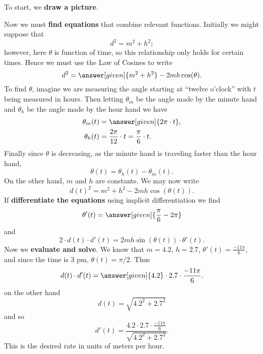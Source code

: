 \documentclass{ximera}
\begin{document}
\begin{example}
  \begin{explanation}
    To start, we \textbf{draw a picture}.
    \begin{image}
    \end{image}
    Now we must \textbf{find equations} that combine relevant
    functions. Initially we might suppose that
    \[
    d^2 = m^2 + h^2;
    \]
    however, here $\theta$ is function of time, so this relationship
    only holds for certain times. Hence we must use the Law of Cosines
    to write
    \[
    d^2 = \answer[given]{m^2 + h^2} - 2mh\cos(\theta).
    \]
    To find $\theta$, imagine we are measuring the angle starting at
    ``twelve o'clock'' with $t$ being measured in hours. Then letting
    $\theta_m$ be the angle made by the minute hand and $\theta_h$ be
    the angle made by the hour hand we have
    \begin{align*}
      \theta_m(t) &= \answer[given]{2\pi \cdot t},\\
      \theta_h(t) &= \frac{2\pi}{12}\cdot t =\frac{\pi}{6}\cdot t.
    \end{align*}
    Finally since $\theta$ is decreasing, as the minute hand is
    traveling faster than the hour hand,
    \[
    \theta(t) = \theta_h(t) - \theta_m(t).
    \]
    On the other hand, $m$ and $h$ are constants. We may now write
    \[
    d(t)^2 = m^2 + h^2 - 2mh\cos(\theta(t)).
    \]
    If \textbf{differentiate the equations} using implicit
    differentiation we find
    \[
    \theta'(t) = \answer[given]{\frac{\pi}{6}-2\pi}
    \]
    and
    \[
    2\cdot d(t) \cdot d'(t)  = 2mh\sin(\theta(t))\cdot \theta'(t).
    \]
    Now we \textbf{evaluate and solve}.  We know that $m=4.2$,
    $h=2.7$, $\theta'(t) = \frac{-11\pi}{6}$, and since the time is $3$
    pm, $\theta(t) = \pi/2$. Thus
    \[
    d(t) \cdot d'(t)  = \answer[given]{4.2}\cdot 2.7\cdot \frac{-11\pi}{6}.
    \]
    on the other hand
    \[
    d(t) = \sqrt{4.2^2 + 2.7^2}
    \]
    and so
    \[
    d'(t) = \frac{4.2\cdot 2.7\cdot \frac{-11\pi}{6}}{\sqrt{4.2^2 + 2.7^2}}.
    \]
    This is the desired rate in units of meters per hour.
  \end{explanation}
\end{example}
\end{document}
